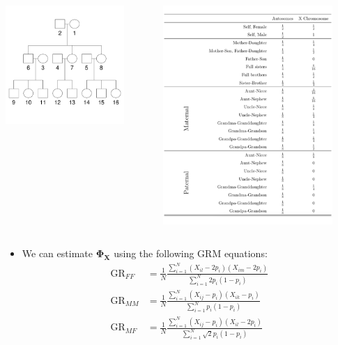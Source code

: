 \documentclass{beamer}
\begin{document}
\begin{frame}
\begin{columns}
    \begin{column}{0.3\textwidth}
      \centering
      \includegraphics[height=4.5cm]{../pedigree_16individs.pdf}
    \end{column}
    \begin{column}{0.5\textwidth}
      \centering
      \includegraphics[height=8.3cm]{../olga_presentation_26jan15/xchr_kc_values.pdf}
    \end{column}
 \end{columns}
\end{frame}

\begin{frame}
\begin{itemize}
\item We can estimate $\mathbf{\Phi_X}$ using the following GRM equations:
\begin{align*}
\mbox{GR}_{FF}&=\frac{1}{N} \frac{\sum_{i=1}^N(X_{il}-2p_i)(X_{im}-2p_i)}{\sum_{i=1}^N2p_i(1-p_i)}\\
\mbox{GR}_{MM}&=\frac{1}{N} \frac{\sum_{i=1}^N(X_{ij}-p_i)(X_{ik}-p_i)}{\sum_{i=1}^Np_i(1-p_i)}\\
\mbox{GR}_{MF}&=\frac{1}{N} \frac{\sum_{i=1}^N(X_{ij}-p_i)(X_{il}-2p_i)}{\sum_{i=1}^N\sqrt{2}p_i(1-p_i)}
\end{align*}
\end{itemize}
\end{frame}
\end{document}
